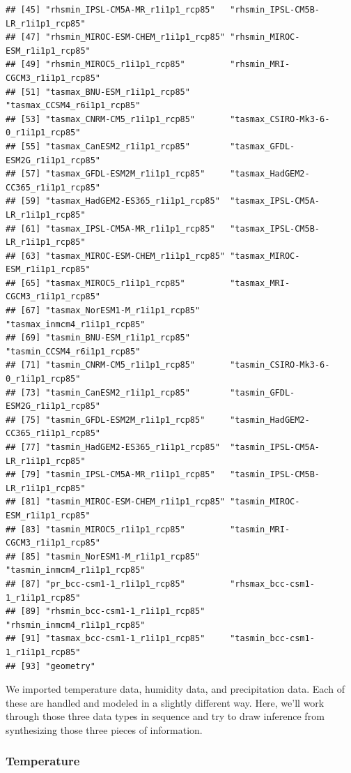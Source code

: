 \documentclass[
  paper=a4,
  ,captions=tableheading
]{scrartcl}
\begin{document}
\begin{verbatim}
## [45] "rhsmin_IPSL-CM5A-MR_r1i1p1_rcp85"   "rhsmin_IPSL-CM5B-LR_r1i1p1_rcp85"  
## [47] "rhsmin_MIROC-ESM-CHEM_r1i1p1_rcp85" "rhsmin_MIROC-ESM_r1i1p1_rcp85"     
## [49] "rhsmin_MIROC5_r1i1p1_rcp85"         "rhsmin_MRI-CGCM3_r1i1p1_rcp85"     
## [51] "tasmax_BNU-ESM_r1i1p1_rcp85"        "tasmax_CCSM4_r6i1p1_rcp85"         
## [53] "tasmax_CNRM-CM5_r1i1p1_rcp85"       "tasmax_CSIRO-Mk3-6-0_r1i1p1_rcp85" 
## [55] "tasmax_CanESM2_r1i1p1_rcp85"        "tasmax_GFDL-ESM2G_r1i1p1_rcp85"    
## [57] "tasmax_GFDL-ESM2M_r1i1p1_rcp85"     "tasmax_HadGEM2-CC365_r1i1p1_rcp85" 
## [59] "tasmax_HadGEM2-ES365_r1i1p1_rcp85"  "tasmax_IPSL-CM5A-LR_r1i1p1_rcp85"  
## [61] "tasmax_IPSL-CM5A-MR_r1i1p1_rcp85"   "tasmax_IPSL-CM5B-LR_r1i1p1_rcp85"  
## [63] "tasmax_MIROC-ESM-CHEM_r1i1p1_rcp85" "tasmax_MIROC-ESM_r1i1p1_rcp85"     
## [65] "tasmax_MIROC5_r1i1p1_rcp85"         "tasmax_MRI-CGCM3_r1i1p1_rcp85"     
## [67] "tasmax_NorESM1-M_r1i1p1_rcp85"      "tasmax_inmcm4_r1i1p1_rcp85"        
## [69] "tasmin_BNU-ESM_r1i1p1_rcp85"        "tasmin_CCSM4_r6i1p1_rcp85"         
## [71] "tasmin_CNRM-CM5_r1i1p1_rcp85"       "tasmin_CSIRO-Mk3-6-0_r1i1p1_rcp85" 
## [73] "tasmin_CanESM2_r1i1p1_rcp85"        "tasmin_GFDL-ESM2G_r1i1p1_rcp85"    
## [75] "tasmin_GFDL-ESM2M_r1i1p1_rcp85"     "tasmin_HadGEM2-CC365_r1i1p1_rcp85" 
## [77] "tasmin_HadGEM2-ES365_r1i1p1_rcp85"  "tasmin_IPSL-CM5A-LR_r1i1p1_rcp85"  
## [79] "tasmin_IPSL-CM5A-MR_r1i1p1_rcp85"   "tasmin_IPSL-CM5B-LR_r1i1p1_rcp85"  
## [81] "tasmin_MIROC-ESM-CHEM_r1i1p1_rcp85" "tasmin_MIROC-ESM_r1i1p1_rcp85"     
## [83] "tasmin_MIROC5_r1i1p1_rcp85"         "tasmin_MRI-CGCM3_r1i1p1_rcp85"     
## [85] "tasmin_NorESM1-M_r1i1p1_rcp85"      "tasmin_inmcm4_r1i1p1_rcp85"        
## [87] "pr_bcc-csm1-1_r1i1p1_rcp85"         "rhsmax_bcc-csm1-1_r1i1p1_rcp85"    
## [89] "rhsmin_bcc-csm1-1_r1i1p1_rcp85"     "rhsmin_inmcm4_r1i1p1_rcp85"        
## [91] "tasmax_bcc-csm1-1_r1i1p1_rcp85"     "tasmin_bcc-csm1-1_r1i1p1_rcp85"    
## [93] "geometry"
\end{verbatim}

We imported temperature data, humidity data, and precipitation data.
Each of these are handled and modeled in a slightly different way. Here,
we'll work through those three data types in sequence and try to draw
inference from synthesizing those three pieces of information.

\hypertarget{temperature}{%
\subsubsection{Temperature}\label{temperature}}
\end{document}
